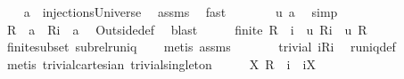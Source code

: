 \begin{isabellebody}
\ \ \isamarkupfalse%
\ {\isachardoublequoteopen}a\ {\isasymin}\ injectionsUniverse{\isachardoublequoteclose}\ \isamarkupfalse%
\ assms\ \isamarkupfalse%
\ fast\ \isamarkupfalse%
\ \isamarkupfalse%
\ \isanewline
\ \ {}{\isacharcolon}\ {\isachardoublequoteopen}{\isacharquery}u\ a{\isachardoublequoteclose}\ \isamarkupfalse%
\ simp\isanewline
\ \ \isamarkupfalse%
\ \isamarkupfalse%
\ {\isachardoublequoteopen}{\isacharquery}R\ {\isasymsubseteq}\ a\ {\isacharampersand}\ {\isacharquery}R{\isacharminus}{\isacharminus}i\ {\isasymsubseteq}\ a{\isachardoublequoteclose}\ \isamarkupfalse%
\ Outside{\isacharunderscore}def\ \isamarkupfalse%
\ blast\isanewline
\ \ \isamarkupfalse%
\ \isamarkupfalse%
\ {\isachardoublequoteopen}finite\ {\isacharparenleft}{\isacharquery}R\ {\isacharminus}{\isacharminus}\ i{\isacharparenright}\ {\isacharampersand}\ {\isacharquery}u\ {\isacharparenleft}{\isacharquery}R{\isacharminus}{\isacharminus}i{\isacharparenright}\ {\isacharampersand}\ {\isacharquery}u\ {\isacharquery}R{\isachardoublequoteclose}\ \isamarkupfalse%
\ finite{\isacharunderscore}subset\ subrel{\isacharunderscore}runiq\isanewline
\ \ \isamarkupfalse%
\ {\isacharparenleft}metis\ assms{\isacharparenleft}{}{\isacharparenright}{\isacharparenright}\isanewline
\ \ \isamarkupfalse%
\ \isamarkupfalse%
\ \isamarkupfalse%
\ {\isachardoublequoteopen}trivial\ {\isacharparenleft}{\isacharbraceleft}i{\isacharbraceright}{\isasymtimes}{\isacharparenleft}{\isacharquery}R{\isacharbackquote}{\isacharbackquote}{\isacharbraceleft}i{\isacharbraceright}{\isacharparenright}{\isacharparenright}{\isachardoublequoteclose}\ \isamarkupfalse%
\ runiq{\isacharunderscore}def\ \isanewline
\ \ \isamarkupfalse%
\ {\isacharparenleft}metis\ trivial{\isacharunderscore}cartesian\ trivial{\isacharunderscore}singleton{\isacharparenright}\isanewline
\ \ \isamarkupfalse%
\ \isamarkupfalse%
\ {\isachardoublequoteopen}{\isasymforall}X{\isachardot}\ {\isacharparenleft}{\isacharquery}R\ {\isacharminus}{\isacharminus}\ i{\isacharparenright}\ {\isasyminter}\ {\isacharparenleft}{\isacharbraceleft}i{\isacharbraceright}{\isasymtimes}X{\isacharparenright}{\isacharequal}{\isacharbraceleft}{\isacharbraceright}{\isachardoublequoteclose}\ \isamarkupfalse%

\end{isabellebody}
